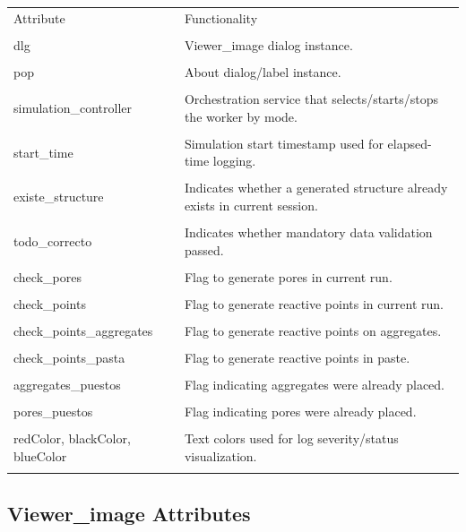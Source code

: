 ﻿\documentclass[11pt,a4paper]{article}
\begin{document}
\begin{longtable}{|p{}|p{}|}
\hline
Attribute & Functionality \\\\
\hline
dlg & Viewer\_image dialog instance. \\\\
\hline
pop & About dialog/label instance. \\\\
\hline
simulation\_controller & Orchestration service that selects/starts/stops the worker by mode. \\\\
\hline
start\_time & Simulation start timestamp used for elapsed-time logging. \\\\
\hline
existe\_structure & Indicates whether a generated structure already exists in current session. \\\\
\hline
todo\_correcto & Indicates whether mandatory data validation passed. \\\\
\hline
check\_pores & Flag to generate pores in current run. \\\\
\hline
check\_points & Flag to generate reactive points in current run. \\\\
\hline
check\_points\_aggregates & Flag to generate reactive points on aggregates. \\\\
\hline
check\_points\_pasta & Flag to generate reactive points in paste. \\\\
\hline
aggregates\_puestos & Flag indicating aggregates were already placed. \\\\
\hline
pores\_puestos & Flag indicating pores were already placed. \\\\
\hline
redColor, blackColor, blueColor & Text colors used for log severity/status visualization. \\\\
\hline
\end{longtable}


\subsection*{Viewer\_image Attributes}
\end{document}
